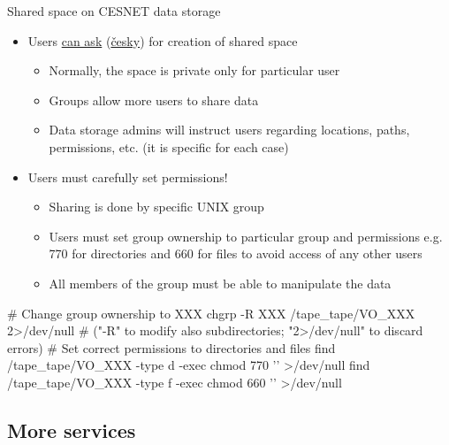 \documentclass[compress, xelatex, 11pt, xcolor=svgnames, aspectratio=169,
	hyperref={
		bookmarks=true,
		unicode=true,
		colorlinks=true,
		pdftitle={Linux, command line and MetaCentrum},
		plainpages=false,
		pdfauthor={Vojtech Zeisek},
		pdfsubject={Course about use of Linux command line, writing shell scripts and using MetaCentrum of CESNET},
		pdfcreator={XeLaTeX},
		pdfkeywords={Linux, GNU, BASH, shell, command line, MetaCentrum},
		linkcolor=DarkRed, %
		anchorcolor=DarkBlue, %
		citecolor=Indigo, %
		filecolor=NavyBlue, %
		menucolor=DarkMagenta, %
		urlcolor=DarkBlue, %
		},
	url={hyphens, lowtilde} %
	]{beamer}
\begin{document}
\begin{frame}[fragile]{Shared space on CESNET data storage}
	\begin{itemize}
		\item Users \href{https://du.cesnet.cz/en/uzivatelska_podpora/start}{can ask} (\href{https://du.cesnet.cz/cs/uzivatelska_podpora/start}{česky}) for creation of shared space
		\begin{itemize}
			\item Normally, the space is private only for particular user
			\item Groups allow more users to share data
			\item Data storage admins will instruct users regarding locations, paths, permissions, etc. (it is specific for each case)
		\end{itemize}
		\item Users must carefully set permissions!
		\begin{itemize}
			\item Sharing is done by specific UNIX group
			\item Users must set group ownership to particular group and permissions e.g. 770 for directories and 660 for files to avoid access of any other users
			\item All members of the group must be able to manipulate the data
		\end{itemize}
	\end{itemize}
	\vfill
	\begin{bashcode}
    # Change group ownership to XXX
    chgrp -R XXX /tape_tape/VO_XXX 2>/dev/null
    # ("-R" to modify also subdirectories; "2>/dev/null" to discard errors)
    # Set correct permissions to directories and files
    find /tape_tape/VO_XXX -type d -exec chmod 770 '{}' >/dev/null
    find /tape_tape/VO_XXX -type f -exec chmod 660 '{}' >/dev/null
	\end{bashcode}
\end{frame}

\subsection{More services}
\end{document}
